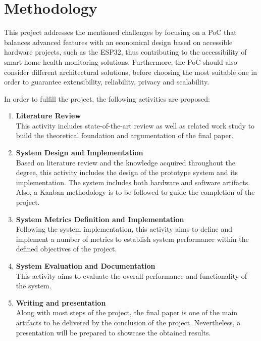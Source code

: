 \documentclass[12pt]{article}
\begin{document}
\section{Methodology}

This project addresses the mentioned challenges by focusing on a PoC that balances advanced features with an economical design based on accessible hardware projects, such as the ESP32, thus contributing to the accessibility of smart home health monitoring solutions. Furthermore, the PoC should also consider different architectural solutions, before choosing the most suitable one in order to guarantee extensibility, reliability, privacy and scalability.

In order to fulfill the project, the following activities are proposed:

\begin{enumerate}
    \item \textbf{Literature Review} \\ This activity includes state-of-the-art review as well as related work study to build the theoretical foundation and argumentation of the final paper.
    \item \textbf{System Design and Implementation} \\ Based on literature review and the knowledge acquired throughout the degree, this activity includes the design of the prototype system and its implementation. The system includes both hardware and software artifacts. Also, a Kanban \cite{kanban2000swamidass} methodology is to be followed to guide the completion of the project.
    \item \textbf{System Metrics Definition and Implementation} \\ Following the system implementation, this activity aims to define and implement a number of metrics to establish system performance within the defined objectives of the project.
    \item \textbf{System Evaluation and Documentation} \\ This activity aims to evaluate the overall performance and functionality of the system.
    \item \textbf{Writing and presentation} \\ Along with most steps of the project, the final paper is one of the main artifacts to be delivered by the conclusion of the project. Nevertheless, a presentation will be prepared to showcase the obtained results.
\end{enumerate}
\end{document}
